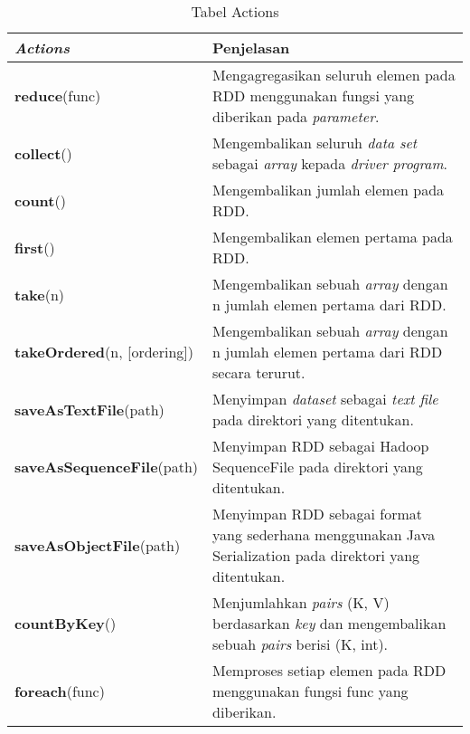 \begin{table}[H] 
	\centering 
	\caption{Tabel Actions}
	\label{tab:actions}
	\begin{tabular}{p{6cm}p{9cm}}
		\toprule[1.5pt]
\hline
		 \textbf{\textit{Actions}} & Penjelasan \\
\hline
\midrule

\hline
\textbf{reduce}(func) & Mengagregasikan seluruh elemen pada RDD menggunakan fungsi yang diberikan pada \textit{parameter}. \\

\hline
\textbf{collect}() & Mengembalikan seluruh \textit{data set} sebagai \textit{array} kepada \textit{driver program}. \\

\hline
\textbf{count}() & Mengembalikan jumlah elemen pada RDD. \\

\hline
\textbf{first}() & Mengembalikan elemen pertama pada RDD. \\

\hline
\textbf{take}(n) & Mengembalikan sebuah \textit{array} dengan n jumlah elemen pertama dari RDD.\\

\hline
\textbf{takeOrdered}(n, [ordering]) & Mengembalikan sebuah \textit{array} dengan n jumlah elemen pertama dari RDD secara terurut. \\

\hline
\textbf{saveAsTextFile}(path) & Menyimpan \textit{dataset} sebagai \textit{text file} pada direktori yang ditentukan. \\

\hline
\textbf{saveAsSequenceFile}(path) & Menyimpan RDD sebagai Hadoop SequenceFile pada direktori yang ditentukan.\\

\hline
\textbf{saveAsObjectFile}(path) & Menyimpan RDD sebagai format yang sederhana menggunakan Java Serialization pada direktori yang ditentukan.\\

\hline
\textbf{countByKey}() & Menjumlahkan \textit{pairs} (K, V) berdasarkan \textit{key} dan mengembalikan sebuah \textit{pairs} berisi (K, int). \\

\hline
\textbf{foreach}(func) & Memproses setiap elemen pada RDD menggunakan fungsi func yang diberikan. \\

\hline


\bottomrule
	\end{tabular} 
\end{table}

